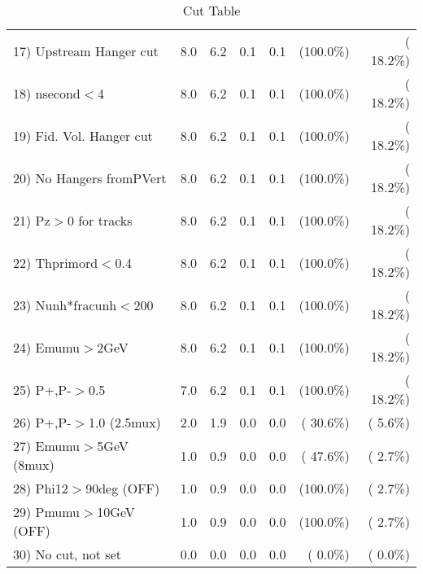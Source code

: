 \begin{table}[h!]
\begin{tabular}{||l||r|r|r|r|r|r||}
 17) Upstream Hanger cut  &          8.0 &          6.2 &          0.1 &          0.1 & (100.0\%) & ( 18.2\%) \\
 18) nsecond$<$4          &          8.0 &          6.2 &          0.1 &          0.1 & (100.0\%) & ( 18.2\%) \\
 19) Fid. Vol. Hanger cut &          8.0 &          6.2 &          0.1 &          0.1 & (100.0\%) & ( 18.2\%) \\
 20) No Hangers fromPVert &          8.0 &          6.2 &          0.1 &          0.1 & (100.0\%) & ( 18.2\%) \\
 21) Pz$>$0 for tracks    &          8.0 &          6.2 &          0.1 &          0.1 & (100.0\%) & ( 18.2\%) \\
 22) Thprimord$<$0.4      &          8.0 &          6.2 &          0.1 &          0.1 & (100.0\%) & ( 18.2\%) \\
 23) Nunh*fracunh$<$200   &          8.0 &          6.2 &          0.1 &          0.1 & (100.0\%) & ( 18.2\%) \\
 24) Emumu$>$2GeV         &          8.0 &          6.2 &          0.1 &          0.1 & (100.0\%) & ( 18.2\%) \\
 25) P+,P-$>$0.5          &          7.0 &          6.2 &          0.1 &          0.1 & (100.0\%) & ( 18.2\%) \\
 26) P+,P-$>$1.0 (2.5mux) &          2.0 &          1.9 &          0.0 &          0.0 & ( 30.6\%) & (  5.6\%) \\
 27) Emumu$>$5GeV  (8mux) &          1.0 &          0.9 &          0.0 &          0.0 & ( 47.6\%) & (  2.7\%) \\
 28) Phi12$>$90deg  (OFF) &          1.0 &          0.9 &          0.0 &          0.0 & (100.0\%) & (  2.7\%) \\
 29) Pmumu$>$10GeV  (OFF) &          1.0 &          0.9 &          0.0 &          0.0 & (100.0\%) & (  2.7\%) \\
 30) No cut, not set      &          0.0 &          0.0 &          0.0 &          0.0 & (  0.0\%) & (  0.0\%) \\
 \hline
 \hline
 \end{tabular}
 \caption{Cut Table           }
 \label{tab-cutheavy_neutrino_4.000}
 \end{table}
